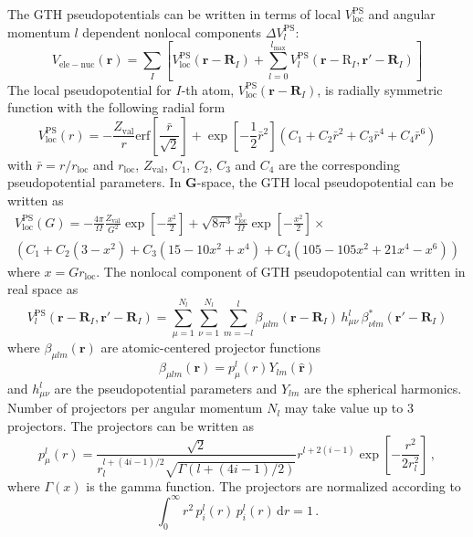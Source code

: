 The GTH pseudopotentials can be written in terms of
local $V^{\mathrm{PS}}_{\mathrm{loc}}$ and
angular momentum $l$ dependent
nonlocal components $\Delta V^{\mathrm{PS}}_{l}$:
\begin{equation}
V_{\mathrm{ele-nuc}}(\mathbf{r}) =
\sum_{I} \left[
V^{\mathrm{PS}}_{\mathrm{loc}}(\mathbf{r}-\mathbf{R}_{I}) +
\sum_{l=0}^{l_{\mathrm{max}}}
V^{\mathrm{PS}}_{l}(\mathbf{r}-\mathrm{R}_{I},\mathbf{r}'-\mathbf{R}_{I})
\right]
\end{equation}
%
The local pseudopotential for
$I$-th atom, $V^{\mathrm{PS}}_{\mathrm{loc}}(\mathbf{r}-\mathbf{R}_{I})$,
is radially symmetric
function with the following radial form
\begin{equation}
V^{\mathrm{PS}}_{\mathrm{loc}}(r) =
-\frac{Z_{\mathrm{val}}}{r}\mathrm{erf}\left[
\frac{\bar{r}}{\sqrt{2}} \right] +
\exp\left[-\frac{1}{2}\bar{r}^2\right]\left(
C_{1} + C_{2}\bar{r}^2 + C_{3}\bar{r}^4 + C_{4}\bar{r}^6
\right)
\label{eq:V_ps_loc_R}
\end{equation}
with $\bar{r}=r/r_{\mathrm{loc}}$ and $r_{\mathrm{loc}}$, $Z_{\mathrm{val}}$,
$C_{1}$, $C_{2}$, $C_{3}$ and $C_{4}$ are the corresponding pseudopotential
parameters.
In $\mathbf{G}$-space, the GTH local pseudopotential can be written as
\begin{multline}
V^{\mathrm{PS}}_{\mathrm{loc}}(G) = -\frac{4\pi}{\Omega}\frac{Z_{\mathrm{val}}}{G^2}
\exp\left[-\frac{x^2}{2}\right] +
\sqrt{8\pi^3} \frac{r^{3}_{\mathrm{loc}}}{\Omega}\exp\left[-\frac{x^2}{2}\right]\times\\
\left( C_{1} + C_{2}(3 - x^2) + C_{3}(15 - 10x^2 + x^4) + C_{4}(105 - 105x^2 + 21x^4 - x^6) \right)
\label{eq:V_ps_loc_G}
\end{multline}
where $x=G r_{\mathrm{loc}}$.
%
The nonlocal component of GTH pseudopotential can written in real space as
\begin{equation}
V^{\mathrm{PS}}_{l}(\mathbf{r}-\mathbf{R}_{I},\mathbf{r}'-\mathbf{R}_{I}) =
\sum_{\mu=1}^{N_{l}} \sum_{\nu=1}^{N_{l}} \sum_{m=-l}^{l}
\beta_{\mu lm}(\mathbf{r}-\mathbf{R}_{I})\,
h^{l}_{\mu\nu}\,
\beta^{*}_{\nu lm}(\mathbf{r}'-\mathbf{R}_{I})
\end{equation}
where $\beta_{\mu lm}(\mathbf{r})$ are atomic-centered projector functions
\begin{equation}
\beta_{\mu lm}(\mathbf{r}) = 
p^{l}_{\mu}(r) Y_{lm}(\hat{\mathbf{r}})
\label{eq:proj_NL_R}
\end{equation}
%
and $h^{l}_{\mu\nu}$ are the pseudopotential parameters and
$Y_{lm}$ are the spherical harmonics. Number of projectors per angular
momentum $N_{l}$ may take value up to 3 projectors.
The projectors can be written as
\begin{equation}
p^{l}_{\mu}(r) = \frac{\sqrt{2}}
{r^{l+(4i-1)/2}_{l}\sqrt{\Gamma(l + (4i-1)/2)}} r^{l+2(i-1)}
\exp\left[-\dfrac{r^2}{2r^{2}_{l}}\right] \, ,
\end{equation}
where $\Gamma(x)$ is the gamma function. The projectors are normalized according
to
\begin{equation}
\int_{0}^{\infty} r^2\,p^{l}_{i}(r)\,p^{l}_{i}(r)\,\mathrm{d}r = 1 \, .
\end{equation}

